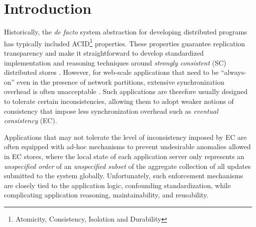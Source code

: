 \documentclass[authorversion]{sig-alternate-05-2015}
\begin{document}

\maketitle


\begin{abstract}
\end{abstract}








\section{Introduction}

Historically, the \emph{de facto} system abstraction for developing distributed
programs has typically included ACID\footnote{Atomicity, Consistency,
Isolation and Durability} properties. These properties
guarantee replication transparency and make it
straightforward to develop standardized implementation and reasoning
techniques around \emph{strongly consistent} (SC) distributed stores \cite{papa,lin}.
However, for web-scale applications that need to be “always-on” even
in the presence of network partitions, extensive
synchronization overhead is often unacceptable \cite{cap}.
Such applications are therefore usually designed to tolerate certain
inconsistencies, allowing them to adopt weaker notions of consistency
that impose less synchronization overhead such as \emph{eventual
consistency} (EC). 

Applications that may not tolerate the level of inconsistency imposed by EC 
are often equipped with ad-hoc mechanisms to prevent 
undesirable anomalies allowed in EC stores, where the local state of
each application server only represents an \emph{unspecified order} of an
\emph{unspecified subset} of the aggregate collection of all updates
submitted to the system globally. Unfortunately, such enforcement
mechanisms are closely tied to the application logic, confounding
standardization, while complicating application reasoning,
maintainability, and reusability.
\end{document}
